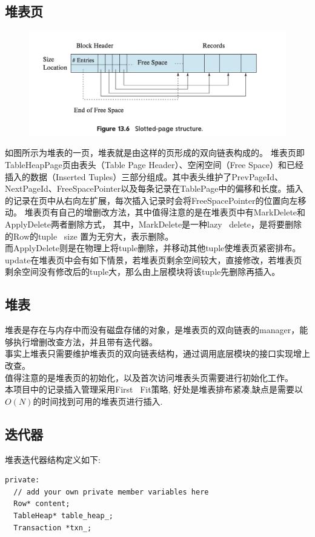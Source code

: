 \documentclass{article}
\begin{document}
\subsection[1]{堆表页}
\begin{figure}
    \centering
    \includegraphics{picture/image.png}
\end{figure}

如图所示为堆表的一页，堆表就是由这样的页形成的双向链表构成的。
堆表页即TableHeapPage页由表头（Table Page Header）、空闲空间（Free Space）和已经插入的数据（Inserted Tuples）三部分组成。其中表头维护了PrevPageId、NextPageId、FreeSpacePointer以及每条记录在TablePage中的偏移和长度。插入的记录在页中从右向左扩展，每次插入记录时会将FreeSpacePointer的位置向左移动。
堆表页有自己的增删改方法，其中值得注意的是在堆表页中有MarkDelete和ApplyDelete两者删除方式，
其中，MarkDelete是一种lazy \ delete，是将要删除的Row的tuple \ size 置为无穷大，表示删除。\\
而ApplyDelete则是在物理上将tuple删除，并移动其他tuple使堆表页紧密排布。
update在堆表页中会有如下情景，若堆表页剩余空间较大，直接修改，若堆表页剩余空间没有修改后的tuple大，那么由上层模块将该tuple先删除再插入。

\subsection[2]{堆表}
堆表是存在与内存中而没有磁盘存储的对象，是堆表页的双向链表的manager，能够执行增删改查方法，并且带有迭代器。
\\ \indent
事实上堆表只需要维护堆表页的双向链表结构，通过调用底层模块的接口实现增上改查。
\\
值得注意的是堆表页的初始化，以及首次访问堆表头页需要进行初始化工作。
\\ \indent
本项目中的记录插入管理采用First \ Fit策略, 好处是堆表排布紧凑,缺点是需要以$O(N)$的时间找到可用的堆表页进行插入.
\subsection[3]{迭代器}
堆表迭代器结构定义如下:
\begin{lstlisting}
private:
  // add your own private member variables here
  Row* content;
  TableHeap* table_heap_;
  Transaction *txn_;
\end{lstlisting}
\end{document}
